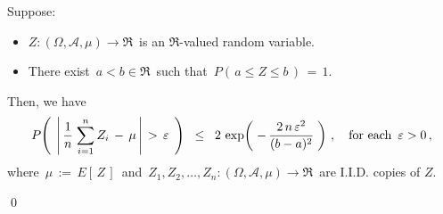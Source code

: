 
\begin{lemma}
\label{lemma:HoeffdingInequality}
\mbox{}\vskip 0.1cm
\noindent
Suppose:
\begin{itemize}
\item
	$Z : (\Omega,\mathcal{A},\mu) \longrightarrow \Re$\,
	is an $\Re$-valued random variable.
\item
	There exist \,$a < b \in \Re$\, such that \,$P\!\left(\,a \leq Z \leq b\,\right) \,=\, 1$.
\end{itemize}
Then, we have
\begin{equation*}
P\!\left(\;\,\left\vert\,
	\dfrac{1}{n}\;\overset{n}{\underset{i=1}{\sum}}\,Z_{i} \, - \, \mu
	\,\right\vert
	\,>\,\varepsilon
	\;\,\right)
\;\; \leq \;\;
	2\,\exp\!\left(\;
		-\,\dfrac{
			2\,n\,\varepsilon^{2}
			}{
			(b-a)^{2}
			}
		\;\right)\,,
\quad
\textnormal{for each \,$\varepsilon > 0$}\,,
\end{equation*}
where
\,$\mu \, := \, E\!\left[\,Z\,\right]$\, and
\,$Z_{1}, Z_{2}, \ldots, Z_{n} : (\Omega,\mathcal{A},\mu) \longrightarrow \Re$\,
are I.I.D. copies of $Z$.
\end{lemma}
\proof
\qed


\renewcommand{\theenumi}{\roman{enumi}}
\renewcommand{\labelenumi}{\textnormal{(\theenumi)}$\;\;$}

